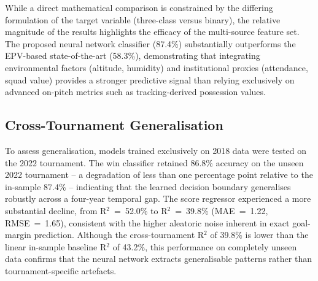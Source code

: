 \documentclass[a4paper,twoside]{article}
\begin{document}
\begin{table}[H]
\centering
\caption{Comparison against recent state-of-the-art pre-match prediction models. Note that the reference models by Forcher et al.\ \cite{forcher_ai_2025} evaluate a three-class outcome (win/draw/loss), whereas our proposed models evaluate a binary win/not-win outcome.}
\label{tab:sota_comparison}
\small
{}
\end{table}

\noindent
While a direct mathematical comparison is constrained by the differing formulation of the target variable (three-class versus binary), the relative magnitude of the results highlights the efficacy of the multi-source feature set. 
The proposed neural network classifier (87.4\%) substantially outperforms the EPV-based state-of-the-art (58.3\%), demonstrating that integrating environmental factors (altitude, humidity) and institutional proxies (attendance, squad value) provides a stronger predictive signal than relying exclusively on advanced on-pitch metrics such as tracking-derived possession values.

\subsection{Cross-Tournament Generalisation}

To assess generalisation, models trained exclusively on 2018 data were tested on the 2022 tournament.
The win classifier retained 86.8\% accuracy on the unseen 2022 tournament -- a degradation of less than one percentage point relative to the in-sample 87.4\% -- indicating that the learned decision boundary generalises robustly across a four-year temporal gap.
The score regressor experienced a more substantial decline, from R$^{2}$~=~52.0\% to R$^{2}$~=~39.8\% (MAE~=~1.22, RMSE~=~1.65), consistent with the higher aleatoric noise inherent in exact goal-margin prediction.
Although the cross-tournament R$^{2}$ of 39.8\% is lower than the linear in-sample baseline R$^{2}$ of 43.2\%, this performance on completely unseen data confirms that the neural network extracts generalisable patterns rather than tournament-specific artefacts.
\end{document}
